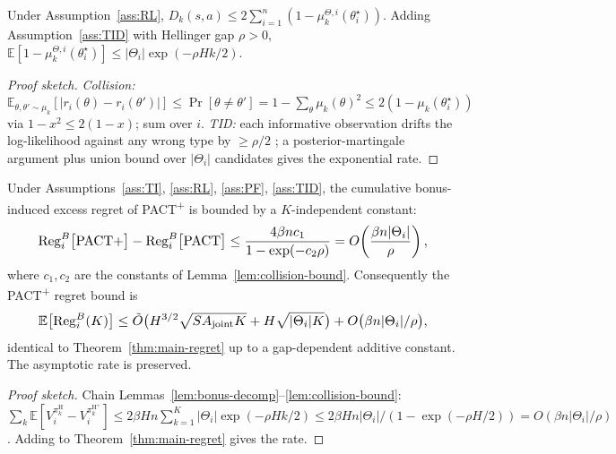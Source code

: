 \begin{lemma}
\label{lem:collision-bound}
Under Assumption~\ref{ass:RL}, $D_k(s,a)\le 2\sum_{i=1}^n(1-\mu_k^{\Theta,i}(\theta_i^\star))$. Adding Assumption~\ref{ass:TID} with Hellinger gap $\rho>0$, $\mathbb{E}[1-\mu_k^{\Theta,i}(\theta_i^\star)]\le |\Theta_i|\exp(-\rho H k/2)$.
\end{lemma}

\begin{proof}[Proof sketch]
\emph{Collision:} $\mathbb{E}_{\theta,\theta'\sim\mu_k}[|r_i(\theta)-r_i(\theta')|]\le \Pr[\theta\ne\theta'] = 1-\sum_\theta\mu_k(\theta)^2 \le 2(1-\mu_k(\theta_i^\star))$ via $1-x^2\le 2(1-x)$; sum over $i$. \emph{TID:} each informative observation drifts the log-likelihood against any wrong type by $\ge\rho/2$ \citep[Lemma~5.3]{ghosal2007convergence}; a posterior-martingale argument plus union bound over $|\Theta_i|$ candidates gives the exponential rate.
\end{proof}

\begin{proposition}
\label{prop:pact-plus-asymptotic}
Under Assumptions~\ref{ass:TI}, \ref{ass:RL}, \ref{ass:PF}, \ref{ass:TID}, the cumulative bonus-induced excess regret of PACT\textsuperscript{+} is bounded by a $K$-independent constant:
\begin{equation}\resizebox{0.9\linewidth}{!}{$\displaystyle \mathrm{Reg}_i^B\big[\textnormal{PACT\textsuperscript{+}}\big] - \mathrm{Reg}_i^B\big[\textnormal{PACT}\big] \leq \frac{4 \beta n c_1}{1 - \exp(-c_2 \rho)} = O\!\left(\frac{\beta n |\Theta_i|}{\rho}\right), $}\end{equation}
where $c_1, c_2$ are the constants of Lemma~\ref{lem:collision-bound}. Consequently the PACT\textsuperscript{+} regret bound is
\begin{equation}\resizebox{0.9\linewidth}{!}{$\displaystyle \mathbb{E}\big[\mathrm{Reg}_i^B(K)\big] \leq \tilde O\big(H^{3/2}\sqrt{SA_{\mathrm{joint}}K} + H\sqrt{|\Theta_i| K}\big) + O\big(\beta n |\Theta_i| / \rho\big), $}\end{equation}
identical to Theorem~\ref{thm:main-regret} up to a gap-dependent additive constant. The asymptotic rate is preserved.
\end{proposition}

\begin{proof}[Proof sketch]
Chain Lemmas~\ref{lem:bonus-decomp}--\ref{lem:collision-bound}: $\sum_k\mathbb{E}[V_i^{\pi_k^{\mathrm{H}}}-V_i^{\pi_k^{\mathrm{H}^+}}]\le 2\beta H n\sum_{k=1}^K|\Theta_i|\exp(-\rho H k/2)\le 2\beta H n|\Theta_i|/(1-\exp(-\rho H/2)) = O(\beta n|\Theta_i|/\rho)$. Adding to Theorem~\ref{thm:main-regret} gives the rate.
\end{proof}


